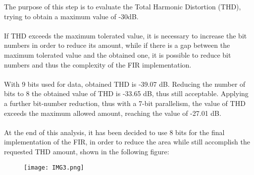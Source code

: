 The purpose of this step is to evaluate the Total Harmonic Distortion (THD), trying to obtain a maximum 
value of -30dB. 
\paragraph{}
If THD exceeds the maximum tolerated value, it is necessary to increase 
the bit numbers in order to reduce its amount, while if there is a gap between the maximum tolerated value 
and the obtained one, it is possible to reduce bit numbers and thus the complexity of the FIR implementation.
\paragraph{}
With 9 bits used for data, obtained THD is -39.07 dB. 
Reducing the number of bits to 8 the obtained value of THD  
is -33.65 dB, thus still acceptable. 
Applying a further bit-number reduction, thus with a 7-bit parallelism, the value of THD exceeds the maximum allowed
amount, reaching the value of -27.01 dB.
\paragraph{}
At the end of this analysis, it has been decided to use 8 bits for the final implementation of the  FIR, 
in order to reduce the area while still accomplish the requested THD amount, shown in the following figure: %
\begin{figure}[!h]
	\texttt{[image: IMG3.png]}
	\centering
\end{figure}


